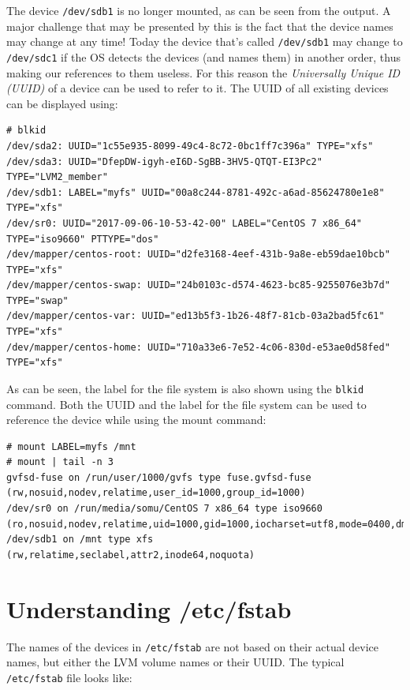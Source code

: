 \noindent
The device \verb|/dev/sdb1| is no longer mounted, as can be seen from the output. A major challenge that may be presented by this is the fact that the device names may change at any time! Today the device that's called \verb|/dev/sdb1| may change to \verb|/dev/sdc1| if the OS detects the devices (and names them) in another order, thus making our references to them useless. For this reason the \textit{Universally Unique ID (UUID)} of a device can be used to refer to it. The UUID of all existing devices can be displayed using:

\vspace{-15pt}
\begin{verbatim}
# blkid
/dev/sda2: UUID="1c55e935-8099-49c4-8c72-0bc1ff7c396a" TYPE="xfs" 
/dev/sda3: UUID="DfepDW-igyh-eI6D-SgBB-3HV5-QTQT-EI3Pc2" TYPE="LVM2_member" 
/dev/sdb1: LABEL="myfs" UUID="00a8c244-8781-492c-a6ad-85624780e1e8" TYPE="xfs" 
/dev/sr0: UUID="2017-09-06-10-53-42-00" LABEL="CentOS 7 x86_64" TYPE="iso9660" PTTYPE="dos" 
/dev/mapper/centos-root: UUID="d2fe3168-4eef-431b-9a8e-eb59dae10bcb" TYPE="xfs" 
/dev/mapper/centos-swap: UUID="24b0103c-d574-4623-bc85-9255076e3b7d" TYPE="swap" 
/dev/mapper/centos-var: UUID="ed13b5f3-1b26-48f7-81cb-03a2bad5fc61" TYPE="xfs" 
/dev/mapper/centos-home: UUID="710a33e6-7e52-4c06-830d-e53ae0d58fed" TYPE="xfs" 
\end{verbatim}
\vspace{-10pt}

\noindent
As can be seen, the label for the file system is also shown using the \verb|blkid| command. Both the UUID and the label for the file system can be used to reference the device while using the mount command:

\vspace{-15pt}
\begin{verbatim}
# mount LABEL=myfs /mnt
# mount | tail -n 3
gvfsd-fuse on /run/user/1000/gvfs type fuse.gvfsd-fuse (rw,nosuid,nodev,relatime,user_id=1000,group_id=1000)
/dev/sr0 on /run/media/somu/CentOS 7 x86_64 type iso9660 (ro,nosuid,nodev,relatime,uid=1000,gid=1000,iocharset=utf8,mode=0400,dmode=0500,uhelper=udisks2)
/dev/sdb1 on /mnt type xfs (rw,relatime,seclabel,attr2,inode64,noquota)
\end{verbatim}
\vspace{-10pt}

	\section{Understanding /etc/fstab}
The names of the devices in \verb|/etc/fstab| are not based on their actual device names, but either the LVM volume names or their UUID. The typical \verb|/etc/fstab| file looks like:

